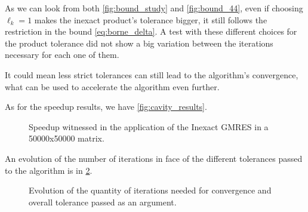 As we can look from both \autoref{fig:bound_study} and \autoref{fig:bound_44}, even if choosing $\ell_{k} = 1$ makes the inexact product's tolerance bigger, it still follows the restriction in the bound \ref{eq:borne_delta}. A test with these different choices for the product tolerance did not show a big variation between the iterations necessary for each one of them.

It could mean less strict tolerances can still lead to the algorithm's convergence, what can be used to accelerate the algorithm even further.

As for the speedup results, we have \autoref{fig:cavity_results}.

\begin{figure}[h!]
    \centering
    
    \caption{Speedup witnessed in the application of the Inexact GMRES in a 50000x50000 matrix.}
    \label{fig:cavity_results}
\end{figure}

An evolution of the number of iterations in face of the different tolerances passed to the algorithm is in \ref{fig:cavity_iterations}.

\begin{figure}[h!]
    \centering
    
    \caption{Evolution of the quantity of iterations needed for convergence and overall tolerance passed as an argument.}
    \label{fig:cavity_iterations}
\end{figure}



